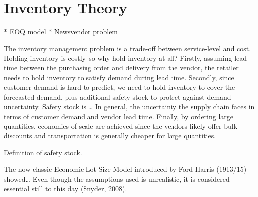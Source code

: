 \documentclass[../../main.tex]{subfiles}
\begin{document}

\section{Inventory Theory}

* EOQ model
* Newsvendor problem

The inventory management problem is a trade-off between service-level and cost. Holding inventory is costly, so why hold inventory at all? Firstly, assuming lead time between the purchasing order and delivery from the vendor, the retailer needs to hold inventory to satisfy demand during lead time. Secondly, since customer demand is hard to predict, we need to hold inventory to cover the forecasted demand, plus additional safety stock to protect against demand uncertainty. Safety stock is … In general, the uncertainty the supply chain faces in terms of customer demand and vendor lead time. Finally, by ordering large quantities, economies of scale are achieved since the vendors likely offer bulk discounts and transportation is generally cheaper for large quantities. 

Definition of safety stock.

The now-classic Economic Lot Size Model introduced by Ford Harris (1913/15) showed… Even though the assumptions used is unrealistic, it is considered essential still to this day (Snyder, 2008).

\end{document}
